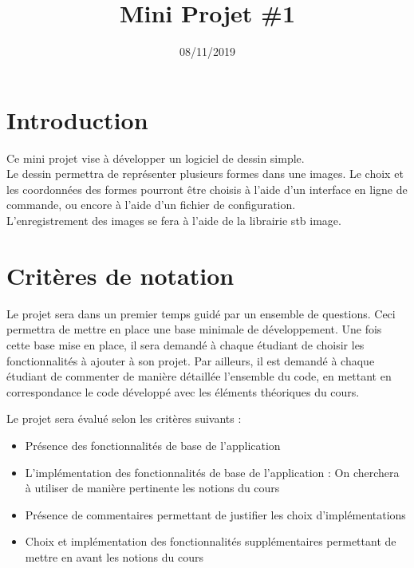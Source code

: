 \documentclass[
	12pt, %
]{fphw}
\title{Mini Projet \#1} %
\author{} %
\date{08/11/2019} %
\institute{ISEN Marseille} %
\begin{document}
\maketitle %


\section*{Introduction}

Ce mini projet vise à développer un logiciel de dessin simple.\\

Le dessin permettra de représenter plusieurs formes dans une images. Le choix et les coordonnées des formes pourront être choisis à l'aide d'un interface en ligne de commande, ou encore à l'aide d'un fichier de configuration.\\

L'enregistrement des images se fera à l'aide de la librairie stb image.


\section*{Critères de notation}

Le projet sera dans un premier temps guidé par un ensemble de questions. Ceci permettra de mettre en place une base minimale de développement.
Une fois cette base mise en place, il sera demandé à chaque étudiant de choisir les fonctionnalités à ajouter à son projet. Par ailleurs, il est demandé à chaque étudiant de commenter de manière détaillée l'ensemble du code, en mettant en correspondance le code développé avec les éléments théoriques du cours.


Le projet sera évalué selon les critères suivants :
\begin{itemize}
	\item Présence des fonctionnalités de base de l'application
	\item L'implémentation des fonctionnalités de base de l'application : On cherchera à utiliser de manière pertinente les notions du cours
	\item Présence de commentaires permettant de justifier les choix d'implémentations
	\item Choix et implémentation des fonctionnalités supplémentaires permettant de mettre en avant les notions du cours
\end{itemize}
\end{document}
